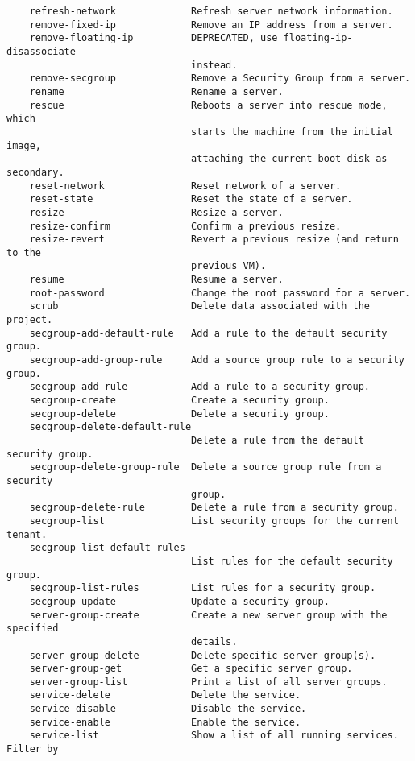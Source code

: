 \documentclass[a4paper,left=1.5cm,right=1.5cm,11pt]{article}
\begin{document}
\begin{lstlisting}
    refresh-network             Refresh server network information.
    remove-fixed-ip             Remove an IP address from a server.
    remove-floating-ip          DEPRECATED, use floating-ip-disassociate
                                instead.
    remove-secgroup             Remove a Security Group from a server.
    rename                      Rename a server.
    rescue                      Reboots a server into rescue mode, which
                                starts the machine from the initial image,
                                attaching the current boot disk as secondary.
    reset-network               Reset network of a server.
    reset-state                 Reset the state of a server.
    resize                      Resize a server.
    resize-confirm              Confirm a previous resize.
    resize-revert               Revert a previous resize (and return to the
                                previous VM).
    resume                      Resume a server.
    root-password               Change the root password for a server.
    scrub                       Delete data associated with the project.
    secgroup-add-default-rule   Add a rule to the default security group.
    secgroup-add-group-rule     Add a source group rule to a security group.
    secgroup-add-rule           Add a rule to a security group.
    secgroup-create             Create a security group.
    secgroup-delete             Delete a security group.
    secgroup-delete-default-rule
                                Delete a rule from the default security group.
    secgroup-delete-group-rule  Delete a source group rule from a security
                                group.
    secgroup-delete-rule        Delete a rule from a security group.
    secgroup-list               List security groups for the current tenant.
    secgroup-list-default-rules
                                List rules for the default security group.
    secgroup-list-rules         List rules for a security group.
    secgroup-update             Update a security group.
    server-group-create         Create a new server group with the specified
                                details.
    server-group-delete         Delete specific server group(s).
    server-group-get            Get a specific server group.
    server-group-list           Print a list of all server groups.
    service-delete              Delete the service.
    service-disable             Disable the service.
    service-enable              Enable the service.
    service-list                Show a list of all running services. Filter by

\end{lstlisting}
\end{document}
